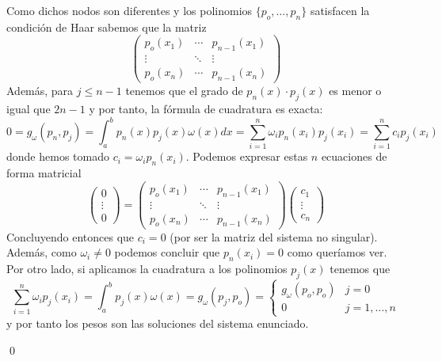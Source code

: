 \begin{dem}
    Como dichos nodos son diferentes y los polinomios $\{p_o,\ldots,p_n\}$ satisfacen la condición de Haar sabemos que la matriz
    $$\left(\begin{array}{ccc}
      p_o(x_1)&\cdots   &p_{n-1}(x_1)  \\
        \vdots &\ddots&\vdots \\
         p_o(x_n)&\cdots   &p_{n-1}(x_n)
    \end{array}\right)$$
    Además, para $j\leq n-1$ tenemos que el grado de $p_n(x)\cdot p_j(x)$ es menor o igual que $2n-1$ y por tanto, la fórmula de cuadratura es exacta:
    $$0=g_{\omega}(p_n,p_j)=\int_a^bp_n(x)p_j(x)\omega(x)dx=\sum_{i=1}^n\omega_ip_n(x_i)p_j(x_i)=\sum_{i=1}^nc_ip_j(x_i)$$
    donde hemos tomado $c_i=\omega_ip_n(x_i)$. Podemos expresar estas $n$ ecuaciones de forma matricial
    $$\left(\begin{array}{c}
          0 \\
          \vdots\\
          0       
    \end{array}\right)=\left(\begin{array}{ccc}
      p_o(x_1)&\cdots   &p_{n-1}(x_1)  \\
        \vdots &\ddots&\vdots \\
         p_o(x_n)&\cdots   &p_{n-1}(x_n)
    \end{array}\right)\left(\begin{array}{c}
          c_1 \\
          \vdots\\
          c_n      
    \end{array}\right)$$
    Concluyendo entonces que $c_i=0$ (por ser la matriz del sistema no singular). Además, como $\omega_i\neq 0$ podemos concluir que $p_n(x_i)=0$ como queríamos ver. Por otro lado, si aplicamos la cuadratura a los polinomios $p_j(x)$ tenemos que
    $$\sum_{i=1}^n\omega_ip_j(x_i)=\int_a^bp_j(x)\omega(x)=g_{\omega}(p_j,p_o)=\left\{\begin{array}{cc}
   g_{\omega}(p_o,p_o)  & j=0  \\
    0 & j=1,\ldots,n
\end{array}\right.$$
y por tanto los pesos son las soluciones del sistema enunciado.
    
 \qed\end{dem}
